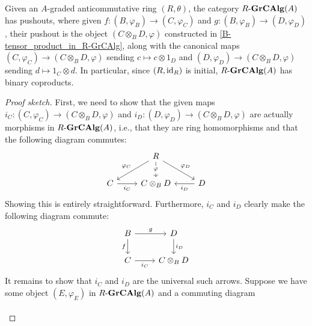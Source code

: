 \documentclass[../main.tex]{subfiles}
\begin{document}
\begin{proposition}\label{R-GrCAlg_has_pushouts_and_binary_coproducts}
	Given an $A$-graded anticommutative ring $(R,\theta)$, the category $R\text-\mathbf{GrCAlg}(A)$ has pushouts, where given $f:(B,\varphi_B)\to (C,\varphi_C)$ and $g:(B,\varphi_B)\to(D,\varphi_D)$, their pushout is the object $(C\otimes_BD,\varphi)$ constructed in \autoref{B-tensor_product_in_R-GrCAlg}, along with the canonical maps $(C,\varphi_C)\to(C\otimes_BD,\varphi)$ sending $c\mapsto c\otimes1_D$ and $(D,\varphi_D)\to(C\otimes_BD,\varphi)$ sending $d\mapsto  1_C\otimes d$. In particular, since $(R,\mathrm{id}_R)$ is initial, $R\text-\mathbf{GrCAlg}(A)$ has binary coproducts.
\end{proposition}
\begin{proof}[Proof sketch]
	First, we need to show that the given maps $i_C:(C,\varphi_C)\to(C\otimes_BD,\varphi)$ and $i_D:(D,\varphi_D)\to(C\otimes_BD,\varphi)$ are actually morphisms in $R\text-\mathbf{GrCAlg}(A)$, i.e., that they are ring homomorphisms and that the following diagram commutes:
	\[\begin{tikzcd}
		& R \\
		C & {C\otimes_BD} & D
		\arrow["{i_C}"', from=2-1, to=2-2]
		\arrow["{i_D}", from=2-3, to=2-2]
		\arrow["{\varphi_C}"', from=1-2, to=2-1]
		\arrow["{\varphi_D}", from=1-2, to=2-3]
		\arrow["\varphi"{description}, from=1-2, to=2-2]
	\end{tikzcd}\]
	Showing this is entirely straightforward. Furthermore, $i_C$ and $i_D$ clearly make the following diagram commute:
	\[\begin{tikzcd}
		B & D \\
		C & {C\otimes_BD}
		\arrow["g", from=1-1, to=1-2]
		\arrow["{i_D}", from=1-2, to=2-2]
		\arrow["f"', from=1-1, to=2-1]
		\arrow["{i_C}"', from=2-1, to=2-2]
	\end{tikzcd}\]
	It remains to show that $i_C$ and $i_D$ are the universal such arrows. Suppose we have some object $(E,\varphi_E)$ in $R\text-\mathbf{GrCAlg}(A)$ and a commuting diagram
	\[\begin{tikzcd}

\end{tikzcd}\]
\end{proof}
\end{document}
